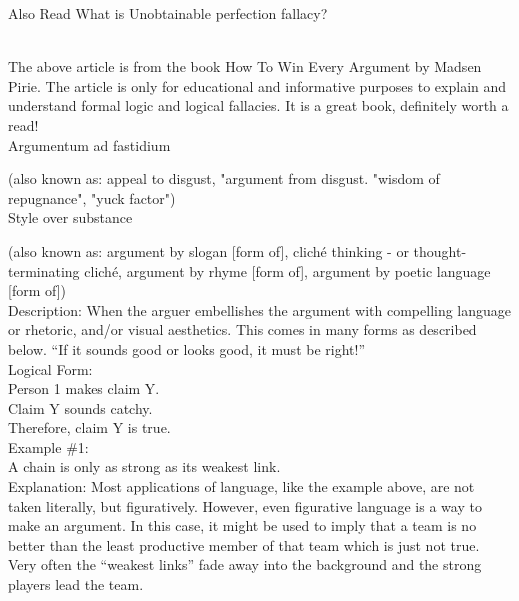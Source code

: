 \documentclass[a4paper,12pt,single,pdftex]{scrartcl}
\begin{document}
    
      

      
        Also Read  What is Unobtainable perfection fallacy?
      
    
    
       
    \\

    
      The above article is from the book How To Win Every Argument by Madsen Pirie. The article is only for educational and informative purposes to explain and understand formal logic and logical fallacies. It is a great book, definitely worth a read!
    \\

  

Argumentum ad fastidium
    
      (also known as: appeal to disgust, "argument from disgust. "wisdom of repugnance", "yuck factor")
    \\

  

Style over substance
    
      (also known as: argument by slogan [form of], cliché thinking - or thought-terminating cliché, argument by rhyme [form of], argument by poetic language [form of])
    \\

  
    
      Description: When the arguer embellishes the argument with compelling language or rhetoric, and/or visual aesthetics. This comes in many forms as described below. “If it sounds good or looks good, it must be right!”
    \\

    
      Logical Form:
    \\

    
      Person 1 makes claim Y.
    \\

    
      Claim Y sounds catchy.
    \\

    
      Therefore, claim Y is true.
    \\

    
      Example \#1:
    \\

    
      A chain is only as strong as its weakest link.
    \\

    
      Explanation: Most applications of language, like the example above, are not taken literally, but figuratively.  However, even figurative language is a way to make an argument.  In this case, it might be used to imply that a team is no better than the least productive member of that team which is just not true.  Very often the “weakest links” fade away into the background and the strong players lead the team.
    \\
\end{document}
